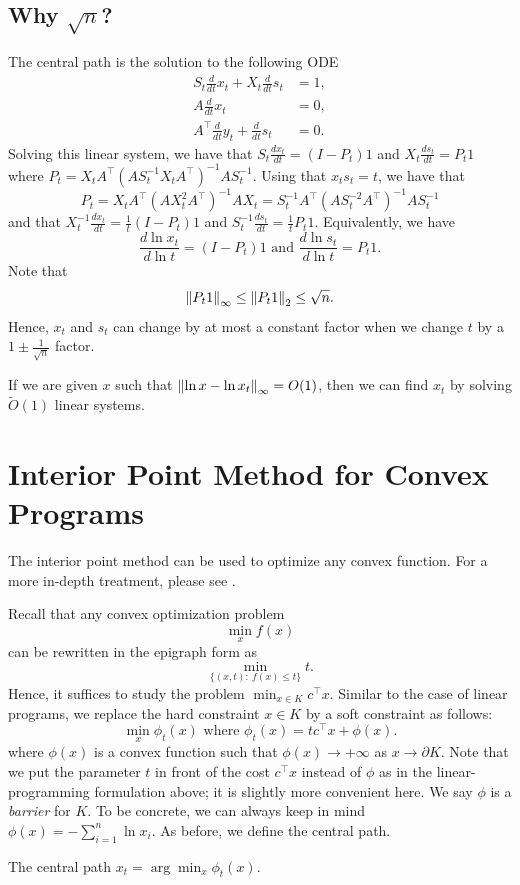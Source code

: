 \subsection{Why $\sqrt{n}$?}

The central path is the solution to the following ODE
\begin{align*}
S_{t}\frac{d}{dt}x_{t}+X_{t}\frac{d}{dt}s_{t} & =1,\\
A\frac{d}{dt}x_{t} & =0,\\
A^{\top}\frac{d}{dt}y_{t}+\frac{d}{dt}s_{t} & =0.
\end{align*}
Solving this linear system, we have that $S_{t}\frac{dx_{t}}{dt}=(I-P_{t})1$
and $X_{t}\frac{ds_{t}}{dt}=P_{t}1$ where $P_{t}=X_{t}A^{\top}(AS^{-1}_{t}X_{t}A^{\top})^{-1}AS^{-1}_{t}$.
Using that $x_{t}s_{t}=t$, we have that
\[
P_{t}=X_{t}A^{\top}(AX^{2}_{t}A^{\top})^{-1}AX_{t}=S^{-1}_{t}A^{\top}(AS^{-2}_{t}A^{\top})^{-1}AS^{-1}_{t}
\]
and that $X^{-1}_{t}\frac{dx_{t}}{dt}=\frac{1}{t}(I-P_{t})1$ and
$S^{-1}_{t}\frac{ds_{t}}{dt}=\frac{1}{t}P_{t}1$. Equivalently, we
have
\[
\frac{d\ln x_{t}}{d\ln t}=(I-P_{t})1\text{ and }\frac{d\ln s_{t}}{d\ln t}=P_{t}1.
\]
Note that 
\[
\left\Vert P_{t}1\right\Vert_{\infty}\leq\left\Vert P_{t}1\right\Vert_{2}\leq\sqrt{n}.
\]
Hence, $x_{t}$ and $s_{t}$ can change by at most a constant factor
when we change $t$ by a $1\pm\frac{1}{\sqrt{n}}$ factor.
\begin{xca}
If we are given $x$ such that $\left\Vert \ln x-\ln x_{t}\right\Vert_{\infty}=O(1)$,
then we can find $x_{t}$ by solving $\tilde{O}(1)$ linear systems.

\end{xca}


\section{Interior Point Method for Convex Programs}

The interior point method can be used to optimize any convex function.
For a more in-depth treatment, please see \cite{nesterov1998introductory}.

Recall that any convex optimization problem
\[
\min_{x}f(x)
\]
can be rewritten in the epigraph form as
\[
\min_{\{(x,t):\ f(x)\leq t\}}t.
\]
Hence, it suffices to study the problem $\min_{x\in K}c^{\top}x$.
Similar to the case of linear programs, we replace the hard constraint
$x\in K$ by a soft constraint as follows:
\[
\min_{x}\phi_{t}(x)\text{ where }\phi_{t}(x)=tc^{\top}x+\phi(x).
\]
where $\phi(x)$ is a convex function such that $\phi(x)\rightarrow+\infty$
as $x\rightarrow\partial K$. Note that we put the parameter $t$
in front of the cost $c^{\top}x$ instead of $\phi$ as in the linear-programming
formulation above; it is slightly more convenient here. We say $\phi$
is a \emph{barrier} for $K$. To be concrete, we can always keep in
mind $\phi(x)=-\sum^{n}_{i=1}\ln x_{i}$. As before, we define the
central path.
\begin{defn}
The central path $x_{t}=\arg\min_{x}\phi_{t}(x)$.
\end{defn}

